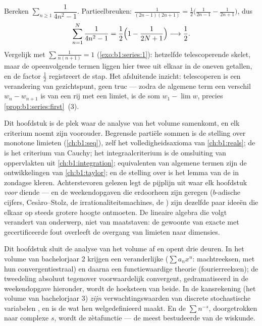 \begin{example}\label{ex:b1:series:oddtelescope}
Bereken $\sum_{n \geq 1} \dfrac{1}{4n^2 - 1}$. Partieelbreuken:
$\frac{1}{(2n-1)(2n+1)} = \frac12\bigl(\frac{1}{2n-1} -
\frac{1}{2n+1}\bigr)$, dus
\[
\sum_{n=1}^{N} \frac{1}{4n^2 - 1}
= \frac12\Bigl(1 - \frac{1}{2N+1}\Bigr)
\longrightarrow \frac12 .
\]
Vergelijk met $\sum \frac{1}{n(n+1)} = 1$
(\cref{exo:b1:series:1}): hetzelfde telescoperende skelet, maar
de opeenvolgende termen liggen hier twee uit elkaar in de oneven
getallen, en de factor $\frac12$ registreert de stap. Het
afsluitende inzicht: telescoperen is een verandering van
gezichtspunt, geen truc --- zodra de algemene term een verschil
$w_n - w_{n+1}$ is van een rij met een limiet, is de som $w_1 -
\lim w$, precies \cref{prop:b1:series:first}~(3).
\end{example}

\begin{remark}
Dit hoofdstuk is de plek waar de analyse van het volume
samenkomt, en elk criterium noemt zijn voorouder. Begrensde
partiële sommen is de stelling over monotone limieten
(\cref{ch:b1:seq}), zelf het volledigheidsaxioma van
\cref{ch:b1:reals}; de  is het criterium
van Cauchy; het integraalcriterium is de omsluiting van
oppervlakten uit \cref{ch:b1:integration}; equivalenten van
algemene termen zijn de ontwikkelingen van \cref{ch:b1:taylor};
en de stelling over  is het lemma van de
 in zondagse kleren. Achterstevoren gelezen legt
de pijplijn uit waar elk hoofdstuk \emph{voor} diende --- en de
weekendopgaven die erdoorheen zijn geregen ($b$-adische cijfers,
Cesàro--Stolz, de irrationaliteitsmachines, de ) zijn dezelfde paar ideeën die elkaar op steeds grotere
hoogte ontmoeten. De lineaire algebra die volgt verandert van
onderwerp, niet van maatstaven: de gewoonte van exacte
 met gecertificeerde fout overleeft de overgang van
limieten naar dimensies.
\end{remark}

\begin{remark}
Dit hoofdstuk sluit de analyse van het volume af en opent drie
deuren. In het volume van bachelorjaar 2 krijgen  een
veranderlijke ($\sum a_n x^n$: machtreeksen, met hun
convergentiestraal) en daarna een functiewaardige theorie
(fourierreeksen); de tweedeling absoluut tegenover voorwaardelijk
convergent, gedramatiseerd in de weekendopgave hieronder, wordt de
hoeksteen van beide. In de kansrekening (het volume van
bachelorjaar 3) \emph{zijn} verwachtingswaarden van discrete
stochastische variabelen , en is de 
wat hen welgedefinieerd maakt. En de  $\sum n^{-s}$,
doorgetrokken naar complexe $s$, wordt de zètafunctie --- de
meest bestudeerde  van de wiskunde.
\end{remark}

